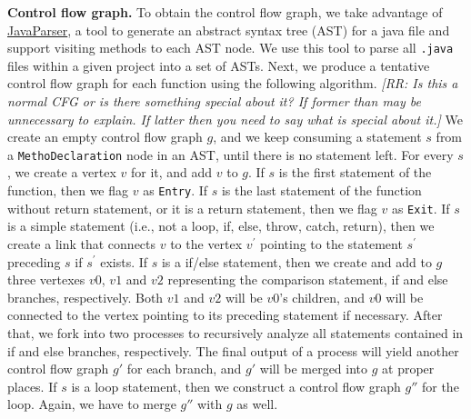 {\bf Control flow graph.} To obtain the control flow graph, we take advantage of 
\href{https://code.google.com/p/javaparser/}{JavaParser},
a tool to generate an abstract syntax tree (AST) for a java file and support visiting
methods to each AST node. We use this tool to parse all {\tt .java} files within a given project into a set of ASTs. Next,
we produce a tentative control flow graph for each function using the following algorithm.
{\em [RR: Is this a normal CFG or is there something special about it? If former than may be unnecessary to
explain. If latter then you need to say what is special about it.]}
We create an empty control flow graph $g$, and we keep consuming a statement $s$ from a \texttt{MethoDeclaration} 
node in an AST, until there is no statement left. For every $s$, we create a vertex $v$
for it, and add $v$ to $g$. If $s$ is the first statement of the function, then
we flag $v$ as \texttt{Entry}. If $s$ is the last statement of the function without
return statement, or it is a return statement, then we flag $v$ as \texttt{Exit}. If $s$
is a simple statement (i.e., not a loop, if, else, throw, catch, return), then we
create a link that connects $v$ to the vertex $v^{'}$ pointing to the statement $s^{'}$
preceding $s$ if $s^{'}$ exists. If $s$ is a if/else statement, then we create and add to $g$
three vertexes $v0$, $v1$ and $v2$ representing the comparison statement, if and else branches, respectively. 
Both $v1$ and $v2$ will be $v0$'s children, and $v0$ will be connected to the vertex pointing
to its preceding statement if necessary. After that, we fork into two processes to recursively analyze all 
statements contained in if and else branches, respectively. The final output of a process will
yield another control flow graph $g'$ for each branch, and $g'$ will be merged into $g$ at proper places.
If $s$ is a loop statement, then we construct a control flow graph $g''$ for the loop. Again,
we have to merge $g''$ with $g$ as well.   

